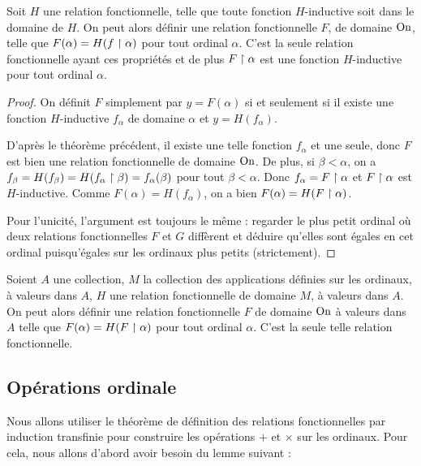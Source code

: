 \begin{them}
    Soit $H$ une relation fonctionnelle, telle que toute fonction $H$-inductive soit dans le domaine de $H$. On peut alors définir une relation fonctionnelle $F$, de domaine $\mathrm{On}$, telle que $F(\alpha) = H(f\upharpoonright\alpha)$ pour tout ordinal $\alpha$. C'est la seule relation fonctionnelle ayant ces propriétés et de plus $F\upharpoonright\alpha$ est une fonction $H$-inductive pour tout ordinal $\alpha$.
\end{them}

\begin{proof}
    On définit $F$ simplement par $y=F(\alpha)$ si et seulement si \og il existe une fonction $H$-inductive $f_\alpha$ de domaine $\alpha$ et $y = H(f_\alpha)$.

    D'après le théorème précédent, il existe une telle fonction $f_\alpha$ et une seule, donc $F$ est bien une relation fonctionnelle de domaine $\mathrm{On}$. De plus, si $\beta < \alpha$, on a $f_\beta = H(f_\beta) = H(f_\alpha\upharpoonright\beta) = f_\alpha(\beta)$ pour tout $\beta < \alpha$. Donc $f_\alpha = F\upharpoonright\alpha$ et $F\upharpoonright\alpha$ est $H$-inductive. Comme $F(\alpha) = H(f_\alpha)$, on a bien $F(\alpha) = H(F\upharpoonright\alpha)$.

    Pour l'unicité, l'argument est toujours le même : regarder le plus petit ordinal où deux relations fonctionnelles $F$ et $G$ diffèrent et déduire qu'elles sont égales en cet ordinal puisqu'égales sur les ordinaux plus petits (strictement).
\end{proof}

\begin{cor}
    Soient $A$ une collection, $M$ la collection des applications définies sur les ordinaux, à valeurs dans $A$, $H$ une relation fonctionnelle de domaine $M$, à valeurs dans $A$. On peut alors définir une relation fonctionnelle $F$ de domaine $\mathrm{On}$ à valeurs dans $A$ telle que $F(\alpha) = H(F\upharpoonright\alpha)$ pour tout ordinal $\alpha$. C'est la seule telle relation fonctionnelle.
\end{cor}

\subsection{Opérations ordinale}

Nous allons utiliser le théorème de définition des relations fonctionnelles par induction transfinie pour construire les opérations $+$ et $\times$ sur les ordinaux. Pour cela, nous allons d'abord avoir besoin du lemme suivant :

